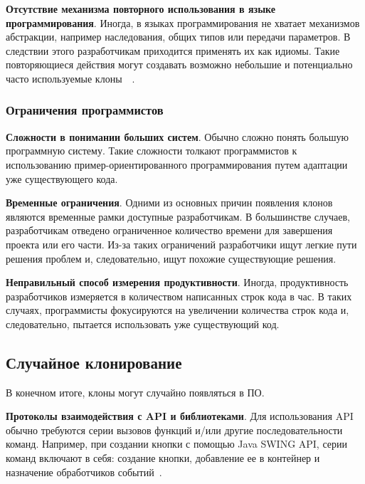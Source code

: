 \textbf{Отсутствие механизма повторного использования в языке программирования}. Иногда, в языках программирования не хватает механизмов абстракции, например наследования, общих типов или передачи параметров. В следствии этого разработчикам приходится применять их как идиомы. Такие повторяющиеся действия могут создавать возможно небольшие и потенциально часто используемые клоны~\cite{javasys}~\cite{templates}.

\subsubsection{Ограничения программистов}

\textbf{Сложности в понимании больших систем}. Обычно сложно понять большую программную систему. Такие сложности толкают программистов к использованию пример-ориентированного программирования путем адаптации уже существующего кода.

\textbf{Временные ограничения}. Одними из основных причин появления клонов являются временные рамки доступные разработчикам. В большинстве случаев, разработчикам отведено ограниченное количество времени для завершения проекта или его части. Из-за таких ограничений разработчики ищут легкие пути решения проблем и, следовательно, ищут похожие существующие решения. 

\textbf{Неправильный способ измерения продуктивности}. Иногда, продуктивность разработчиков измеряется в количеством написанных строк кода в час. В таких случаях, программисты фокусируются на увеличении количества строк кода и, следовательно, пытается использовать уже существующий код.

\subsection{Случайное клонирование}

В конечном итоге, клоны могут случайно появляться в ПО.

\textbf{Протоколы взаимодействия с API и библиотеками}. Для использования API обычно требуются серии вызовов функций и/или другие последовательности команд. Например, при создании кнопки с помощью Java SWING API, серии команд включают в себя: создание кнопки, добавление ее в контейнер и назначение обработчиков событий~\cite{fingerprints}.
% 

